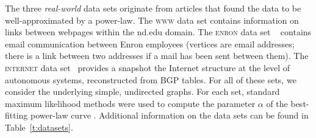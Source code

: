 The three \emph{real-world} data sets originate  from articles that found the data to be well-approximated by a power-law. 
The \textsc{www} data set  \cite{albert1999internet} contains information on links between webpages within the nd.edu domain. 
The \textsc{enron} data set ~\cite{leskovec2009community}  contains email communication between  Enron employees (vertices are email addresses; there is a link between two addresses
if a mail has been sent between them).
The \textsc{internet} data set~\cite{newman} provides a snapshot the Internet structure at the level of  autonomous systems, reconstructed from BGP tables. 
For all of these sets, we consider the underlying simple, undirected graphs. For each set, standard maximum likelihood methods were used to compute the parameter
$\alpha$ of the best-fitting power-law curve \cite{clauset2009power}. Additional information on the data sets can be found in Table~\ref{t:datasets}.

